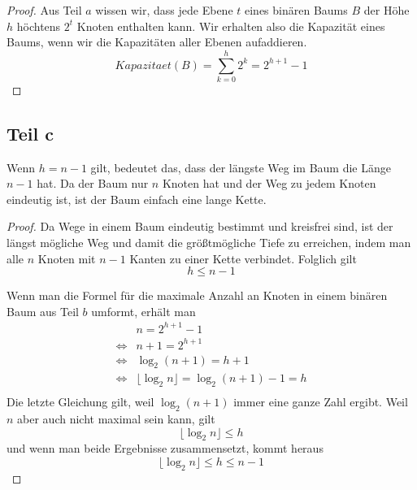 \documentclass[a4paper,10pt]{article}
\begin{document}
\begin{proof}
 Aus Teil $a$ wissen wir, dass jede Ebene $t$ eines binären Baums $B$ der Höhe $h$ höchtens $2^t$ Knoten enthalten kann.
 Wir erhalten also die Kapazität eines Baums, wenn wir die Kapazitäten aller Ebenen aufaddieren.
 \begin{equation}
  Kapazitaet(B) = \sum_{k = 0}^h 2^k = 2^{h + 1} - 1
 \end{equation}
\end{proof}

\subsection*{Teil c}

Wenn $h = n - 1$ gilt, bedeutet das, dass der längste Weg im Baum die Länge $n - 1$ hat.
Da der Baum nur $n$ Knoten hat und der Weg zu jedem Knoten eindeutig ist, ist der Baum einfach eine lange Kette.

\begin{proof}
 Da Wege in einem Baum eindeutig bestimmt und kreisfrei sind, ist der längst mögliche Weg und damit die größtmögliche Tiefe zu erreichen, indem man alle $n$ Knoten mit $n - 1$ Kanten zu einer Kette verbindet.
 Folglich gilt
 \begin{equation}
  h \le n - 1
 \end{equation}

 Wenn man die Formel für die maximale Anzahl an Knoten in einem binären Baum aus Teil $b$ umformt, erhält man
 \begin{align*}
  & n = 2^{h + 1} - 1\\
  \Leftrightarrow & n + 1 = 2^{h + 1}\\
  \Leftrightarrow & \log_2 (n + 1) = h + 1\\
  \Leftrightarrow & \lfloor \log_2 n \rfloor = \log_2 (n + 1) - 1 = h\\
 \end{align*}
 Die letzte Gleichung gilt, weil $\log_2 (n + 1)$ immer eine ganze Zahl ergibt.
 Weil $n$ aber auch nicht maximal sein kann, gilt
 \begin{equation}
  \lfloor \log_2 n \rfloor \le h
 \end{equation}
 und wenn man beide Ergebnisse zusammensetzt, kommt heraus
 \begin{equation}
  \lfloor \log_2 n \rfloor \le h \le n - 1
 \end{equation}
\end{proof}
\end{document}
